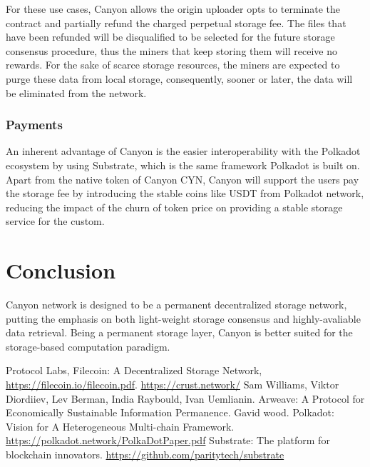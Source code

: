 \documentclass[]{article}
\begin{document}
For these use cases, Canyon allows the origin uploader opts to terminate the contract and partially refund the charged perpetual storage fee. The files that have been refunded will be disqualified to be selected for the future storage consensus procedure, thus the miners that keep storing them will receive no rewards. For the sake of scarce storage resources, the miners are expected to purge these data from local storage, consequently, sooner or later, the data will be eliminated from the network.

\subsubsection{Payments}

An inherent advantage of Canyon is the easier interoperability with the Polkadot\cite{ref4} ecosystem by using Substrate\cite{ref5}, which is the same framework Polkadot is built on. Apart from the native token of Canyon CYN, Canyon will support the users pay the storage fee by introducing the stable coins like USDT from Polkadot network, reducing the impact of the churn of token price on providing a stable storage service for the custom.



\section{Conclusion}


Canyon network is designed to be a permanent decentralized storage network, putting the emphasis on both light-weight storage consensus and highly-avaliable data retrieval. Being a permanent storage layer, Canyon is better suited for the storage-based computation paradigm.

\begin{thebibliography}{99}
Protocol Labs, Filecoin: A Decentralized Storage Network, \url{https://filecoin.io/filecoin.pdf}.
\url{https://crust.network/}
Sam Williams, Viktor Diordiiev, Lev Berman, India Raybould, Ivan Uemlianin. Arweave: A Protocol for Economically Sustainable Information Permanence.
Gavid wood. Polkadot: Vision for A Heterogeneous Multi-chain Framework. \url{https://polkadot.network/PolkaDotPaper.pdf}
Substrate: The platform for blockchain innovators. \url{https://github.com/paritytech/substrate}
\end{thebibliography}
\end{document}
